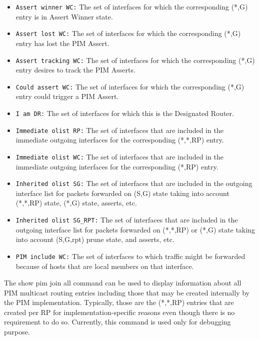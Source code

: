 \begin{itemize}
  \item {\tt Assert winner WC:} The set of interfaces for which the
  corresponding (*,G) entry is in Assert Winner state.

  \item {\tt Assert lost WC:} The set of interfaces for which the
  corresponding (*,G) entry has lost the PIM Assert.

  \item {\tt Assert tracking WC:} The set of interfaces for which the
  corresponding (*,G) entry desires to track the PIM Asserts.

  \item {\tt Could assert WC:} The set of interfaces for which the
  corresponding (*,G) entry could trigger a PIM Assert.

  \item {\tt I am DR:} The set of interfaces for which this is the Designated
  Router.

  \item {\tt Immediate olist RP:} The set of interfaces that are included
  in the immediate outgoing interfaces for the corresponding (*,*,RP) entry.

  \item {\tt Immediate olist WC:} The set of interfaces that are included
  in the immediate outgoing interfaces for the corresponding (*,RP) entry.

  \item {\tt Inherited olist SG:} The set of interfaces that are included
  in the outgoing interface list for packets forwarded on (S,G) state taking
  into account (*,*,RP) state, (*,G) state, asserts, etc.

  \item {\tt Inherited olist SG\_RPT:} The set of interfaces that are included
  in the outgoing interface list for packets forwarded
  on (*,*,RP) or (*,G) state taking into account (S,G,rpt) prune state,
  and asserts, etc.

  \item {\tt PIM include WC:} The set of interfaces to which traffic might be
    forwarded because of hosts that are local members on that interface.

\end{itemize}

The {\stt show pim join all} command can be used to display
information about all PIM multicast routing entries including those that may
be created internally by the PIM implementation. Typically, those are the
(*,*,RP) entries that are created per RP for implementation-specific reasons
even though there is no requirement to do so. Currently, this command is
used only for debugging purpose.


